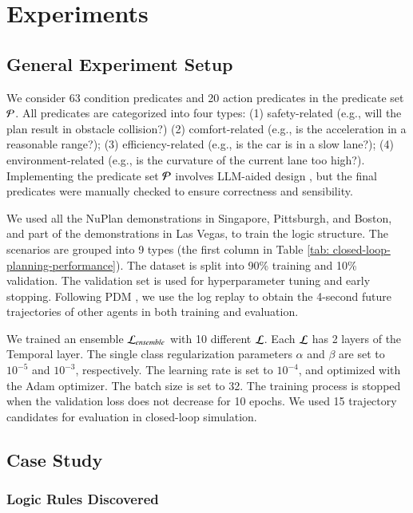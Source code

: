\section{Experiments}

\subsection{General Experiment Setup}
We consider 63 condition predicates and 20 action predicates in the predicate set $\mathcal{P}$.
All predicates are categorized into four types: (1) safety-related (e.g., will the plan result in obstacle collision?) (2) comfort-related (e.g., is the acceleration in a reasonable range?); (3) efficiency-related (e.g., is the car is in a slow lane?); (4) environment-related (e.g., is the curvature of the current lane too high?).
Implementing the predicate set $\mathcal{P}$ involves LLM-aided design \cite{Chen2022CodeTCG}, but the final predicates were manually checked to ensure correctness and sensibility.

We used all the NuPlan demonstrations in Singapore, Pittsburgh, and Boston, and part of the demonstrations in Las Vegas, to train the logic structure. The scenarios are grouped into 9 types (the first column in Table \ref{tab: closed-loop-planning-performance}). The dataset is split into 90\% training and 10\% validation. The validation set is used for hyperparameter tuning and early stopping. Following PDM \cite{Dauner2023CORL}, we use the log replay to obtain the 4-second future trajectories of other agents in both training and evaluation.

We trained an ensemble $\mathcal{L}_{\mathit{ensemble}}$ with 10 different $\mathcal{L}$. Each $\mathcal{L}$ has 2 layers of the Temporal layer. The single class regularization parameters $\alpha$ and $\beta$ are set to $10^{-5}$ and $10^{-3}$, respectively. The learning rate is set to $10^{-4}$, and optimized with the Adam optimizer. The batch size is set to 32. The training process is stopped when the validation loss does not decrease for 10 epochs. We used 15 trajectory candidates for evaluation in closed-loop simulation.

\subsection{Case Study}
\subsubsection{Logic Rules Discovered}
\label{sec:logic_rules_discovered}


